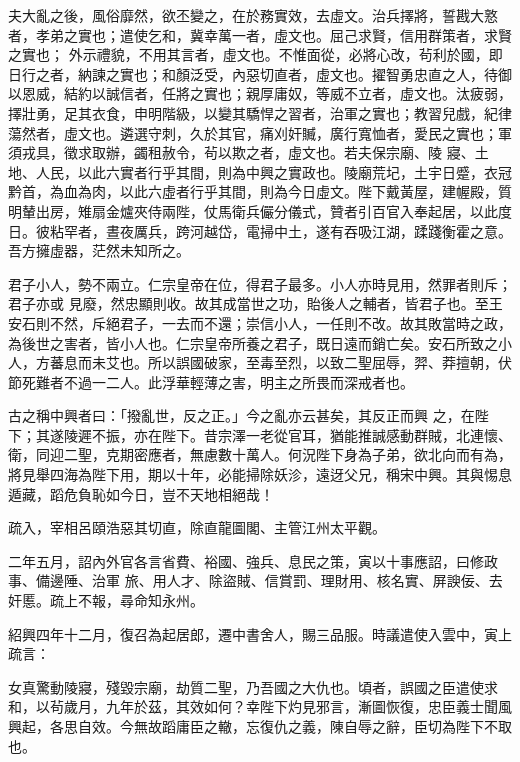 \begin{pinyinscope}
 夫大亂之後，風俗靡然，欲丕變之，在於務實效，去虛文。治兵擇將，誓戡大憝者，孝弟之實也；遣使乞和，冀幸萬一者，虛文也。屈己求賢，信用群策者，求賢之實也；
 外示禮貌，不用其言者，虛文也。不惟面從，必將心改，茍利於國，即日行之者，納諫之實也；和顏泛受，內惡切直者，虛文也。擢智勇忠直之人，待御以恩威，結約以誠信者，任將之實也；親厚庸奴，等威不立者，虛文也。汰疲弱，擇壯勇，足其衣食，申明階級，以變其驕悍之習者，治軍之實也；教習兒戲，紀律蕩然者，虛文也。遴選守刺，久於其官，痛刈奸贓，廣行寬恤者，愛民之實也；軍須戎具，徵求取辦，蠲租赦令，茍以欺之者，虛文也。若夫保宗廟、陵
 寢、土地、人民，以此六實者行乎其間，則為中興之實政也。陵廟荒圮，土宇日蹙，衣冠黔首，為血為肉，以此六虛者行乎其間，則為今日虛文。陛下戴黃屋，建幄殿，質明輦出房，雉扇金爐夾侍兩陛，仗馬衛兵儼分儀式，贊者引百官入奉起居，以此度日。彼粘罕者，晝夜厲兵，跨河越岱，電掃中土，遂有吞吸江湖，蹂踐衡霍之意。吾方擁虛器，茫然未知所之。



 君子小人，勢不兩立。仁宗皇帝在位，得君子最多。小人亦時見用，然罪者則斥；君子亦或
 見廢，然忠顯則收。故其成當世之功，貽後人之輔者，皆君子也。至王安石則不然，斥絕君子，一去而不還；崇信小人，一任則不改。故其敗當時之政，為後世之害者，皆小人也。仁宗皇帝所養之君子，既日遠而銷亡矣。安石所致之小人，方蕃息而未艾也。所以誤國破家，至毒至烈，以致二聖屈辱，羿、莽擅朝，伏節死難者不過一二人。此浮華輕薄之害，明主之所畏而深戒者也。



 古之稱中興者曰：「撥亂世，反之正。」今之亂亦云甚矣，其反正而興
 之，在陛下；其遂陵遲不振，亦在陛下。昔宗澤一老從官耳，猶能推誠感動群賊，北連懷、衛，同迎二聖，克期密應者，無慮數十萬人。何況陛下身為子弟，欲北向而有為，將見舉四海為陛下用，期以十年，必能掃除妖沴，遠迓父兄，稱宋中興。其與惕息遁藏，蹈危負恥如今日，豈不天地相絕哉！



 疏入，宰相呂頤浩惡其切直，除直龍圖閣、主管江州太平觀。



 二年五月，詔內外官各言省費、裕國、強兵、息民之策，寅以十事應詔，曰修政事、備邊陲、治軍
 旅、用人才、除盜賊、信賞罰、理財用、核名實、屏諛佞、去奸慝。疏上不報，尋命知永州。



 紹興四年十二月，復召為起居郎，遷中書舍人，賜三品服。時議遣使入雲中，寅上疏言：



 女真驚動陵寢，殘毀宗廟，劫質二聖，乃吾國之大仇也。頃者，誤國之臣遣使求和，以茍歲月，九年於茲，其效如何？幸陛下灼見邪言，漸圖恢復，忠臣義士聞風興起，各思自效。今無故蹈庸臣之轍，忘復仇之義，陳自辱之辭，臣切為陛下不取也。




\end{pinyinscope}
